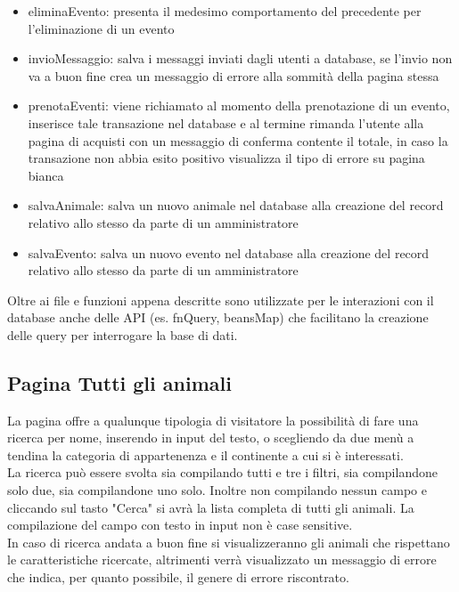 \begin{itemize}
            \item eliminaEvento: presenta il medesimo comportamento del precedente per l'eliminazione di un evento
            \item invioMessaggio: salva i messaggi inviati dagli utenti a database, se l'invio non va a buon fine crea un messaggio di errore alla sommità della pagina stessa
            \item prenotaEventi: viene richiamato al momento della prenotazione di un evento, inserisce tale transazione nel database e al termine rimanda l'utente alla pagina di acquisti con un messaggio di conferma contente il totale, in caso la transazione non abbia esito positivo visualizza il tipo di errore su pagina bianca
            \item salvaAnimale: salva un nuovo animale nel database alla creazione del record relativo allo stesso da parte di un amministratore
            \item salvaEvento: salva un nuovo evento nel database alla creazione del record relativo allo stesso da parte di un amministratore
        \end{itemize}
    Oltre ai file e funzioni appena descritte sono utilizzate per le interazioni con il database anche delle API (es. fnQuery, beansMap) che facilitano la creazione delle query per interrogare la base di dati.
    \subsection{Pagina Tutti gli animali}
        La pagina offre a qualunque tipologia di visitatore la possibilità di fare una ricerca per nome, inserendo in input del testo, o scegliendo da due menù a tendina la categoria di appartenenza e il continente a cui si è interessati.\\
        La ricerca può essere svolta sia compilando tutti e tre i filtri, sia compilandone solo due, sia compilandone uno solo. Inoltre non compilando nessun campo e cliccando sul tasto "Cerca" si avrà la lista completa di tutti gli animali. La compilazione del campo con testo in input non è case sensitive.\\
        In caso di ricerca andata a buon fine si visualizzeranno gli animali che rispettano le caratteristiche ricercate, altrimenti verrà visualizzato un messaggio di errore che indica, per quanto possibile, il genere di errore riscontrato.
\pagebreak
